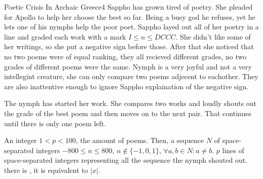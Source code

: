 \begin{task}{Poetic Crisis In Archaic Greece}{4}
Sappho has grown tired of poetry. She pleaded for Apollo to help her choose
the best so far. Being a busy god he refuses, yet he lets one of his nymphs
help the poor poet. Sappho layed out all of her poetry in a line and graded each
work with a mark $I \leq n \leq DCCC$. She didn't like some of her writings, so she
put a negative sign before those. After that she noticed that no two poems were
of equal ranking, they all recieved different grades, no two grades of different
poems were the same.
Nymph is a very joyful and not a very intellegint creature, she can only compare
two poems adjecent to eachother. They are also
inattentive enough to ignore Sappho explaination of the negative sign.

The nymph has started her work. She compares two works and loudly shouts
out the grade of the best poem and then moves on to the next pair. That continues
until there is only one poem left.

\In
An integer $1 < p < 100$, the amount of poems. 
Then, a sequence $N$ of space-separated integers $-800 \leq n \leq 800$, 
$n \nin \{-1, 0, 1\}$, $\forall a, b \in N : a \neq b$.
\Out
$p$ lines of space-separated integers representing all the sequence the nymph shouted out.
\Hint there is , it is equivalent to $|x|$.

\begin{ExampleIO}
\end{ExampleIO}
\end{task}
